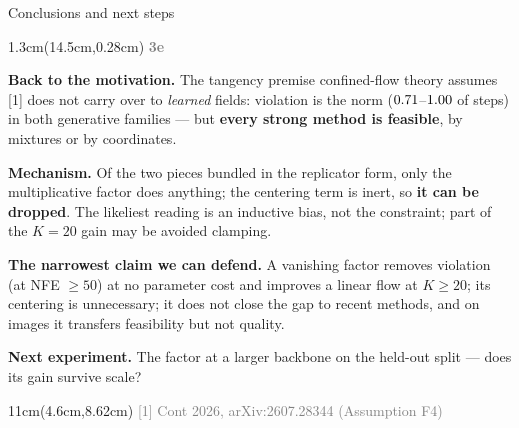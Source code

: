 \documentclass[aspectratio=169,10pt]{beamer}
\newcommand{\lab}[1]{%
  \begin{textblock*}{1.3cm}(14.5cm,0.28cm)
    \raggedleft\bfseries\small\textcolor{gray}{#1}
  \end{textblock*}}
\newcommand{\srcs}[1]{%
  \begin{textblock*}{11cm}(4.6cm,8.62cm)
    \raggedleft\fontsize{4.8}{5.6}\selectfont\textcolor{gray}{#1}
  \end{textblock*}}
\begin{document}
\begin{frame}{Conclusions and next steps}
\lab{3e}
\textbf{Back to the motivation.} The tangency premise confined-flow theory assumes\,[1] does not
carry over to \emph{learned} fields: violation is the norm ($0.71$--$1.00$ of
steps) in both generative families --- but \textbf{every strong method is feasible}, by mixtures or
by coordinates.

\medskip
\textbf{Mechanism.} Of the two pieces bundled in the replicator form, only the multiplicative factor
does anything; the centering term is inert, so \textbf{it can be dropped}.
The likeliest reading is an inductive bias, not the constraint; part of the $K{=}20$ gain may be
avoided clamping.

\medskip
\textbf{The narrowest claim we can defend.} A vanishing factor removes violation (at NFE $\ge50$) at
no parameter cost and improves a linear flow at $K\ge20$; its centering is unnecessary; it does not
close the gap to recent methods, and on images it transfers feasibility but not quality.

\medskip
\textbf{Next experiment.} The factor at a larger backbone on the held-out split --- does its
gain survive scale?
\srcs{[1] Cont 2026, arXiv:2607.28344 (Assumption F4)}
\end{frame}

\end{document}
